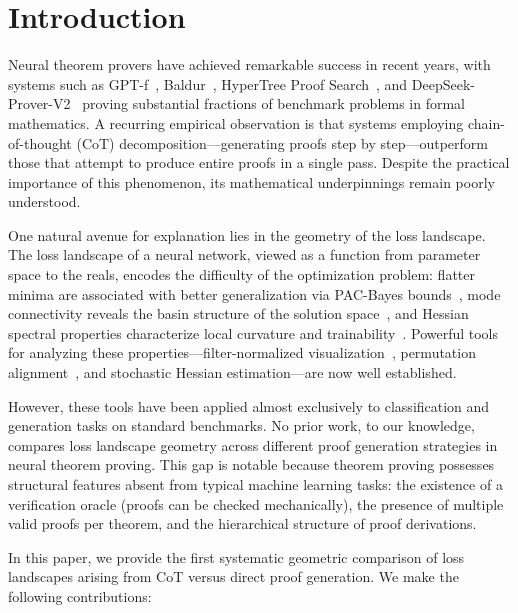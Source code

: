 \section{Introduction}\label{sec:intro}

Neural theorem provers have achieved remarkable success in recent years, with
systems such as GPT-f~\cite{polu2020generative},
Baldur~\cite{first2023baldur}, HyperTree Proof Search~\cite{lample2022hypertree},
and DeepSeek-Prover-V2~\cite{ren2025deepseek} proving substantial fractions of
benchmark problems in formal mathematics. A recurring empirical observation is
that systems employing chain-of-thought (CoT) decomposition---generating proofs
step by step---outperform those that attempt to produce entire proofs in a single
pass. Despite the practical importance of this phenomenon, its mathematical
underpinnings remain poorly understood.

One natural avenue for explanation lies in the geometry of the loss landscape.
The loss landscape of a neural network, viewed as a function from parameter
space to the reals, encodes the difficulty of the optimization problem: flatter
minima are associated with better generalization via PAC-Bayes
bounds~\cite{foret2021sharpness}, mode connectivity reveals the basin structure
of the solution space~\cite{frankle2020linear, kuditipudi2019explaining}, and
Hessian spectral properties characterize local curvature and
trainability~\cite{ghorbani2019investigation}. Powerful tools for analyzing
these properties---filter-normalized
visualization~\cite{li2018visualizing}, permutation alignment~\cite{ainsworth2023git},
and stochastic Hessian estimation---are now well established.

However, these tools have been applied almost exclusively to classification and
generation tasks on standard benchmarks. No prior work, to our knowledge,
compares loss landscape geometry across different proof generation strategies in
neural theorem proving. This gap is notable because theorem proving possesses
structural features absent from typical machine learning tasks: the existence of
a verification oracle (proofs can be checked mechanically), the presence of
multiple valid proofs per theorem, and the hierarchical structure of proof
derivations.

In this paper, we provide the first systematic geometric comparison of loss
landscapes arising from CoT versus direct proof generation. We make the
following contributions:

